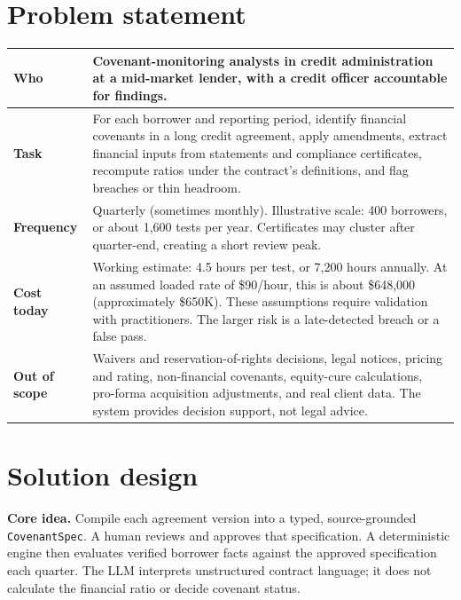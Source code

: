 \documentclass[10pt,letterpaper]{article}
\newcommand{\ct}[1]{\texttt{\small #1}}
\newcommand{\tabsize}{\footnotesize}
\begin{document}
\section{Problem statement}
\begin{tabularx}{\linewidth}{@{}l Y@{}}
\toprule
\tabsize\textbf{Who} & \tabsize Covenant-monitoring analysts in credit administration at a mid-market lender, with a credit officer accountable for findings. \\
\midrule
\tabsize\textbf{Task} & \tabsize For each borrower and reporting period, identify financial covenants in a long credit agreement, apply amendments, extract financial inputs from statements and compliance certificates, recompute ratios under the contract's definitions, and flag breaches or thin headroom. \\
\midrule
\tabsize\textbf{Frequency} & \tabsize Quarterly (sometimes monthly). Illustrative scale: 400 borrowers, or about 1,600 tests per year. Certificates may cluster after quarter-end, creating a short review peak. \\
\midrule
\tabsize\textbf{Cost today} & \tabsize Working estimate: 4.5 hours per test, or 7,200 hours annually. At an assumed loaded rate of \$90/hour, this is about \$648,000 (approximately \$650K). These assumptions require validation with practitioners. The larger risk is a late-detected breach or a false pass. \\
\midrule
\tabsize\textbf{Out of scope} & \tabsize Waivers and reservation-of-rights decisions, legal notices, pricing and rating, non-financial covenants, equity-cure calculations, pro-forma acquisition adjustments, and real client data. The system provides decision support, not legal advice. \\
\bottomrule
\end{tabularx}

\section{Solution design}
\textbf{Core idea.} Compile each agreement version into a typed, source-grounded \ct{CovenantSpec}. A human reviews and approves that specification. A deterministic engine then evaluates verified borrower facts against the approved specification each quarter. The LLM interprets unstructured contract language; it does not calculate the financial ratio or decide covenant status.
\end{document}
